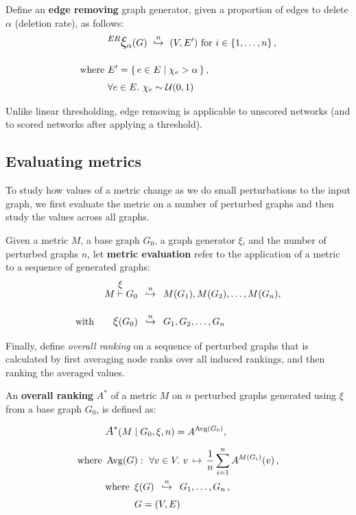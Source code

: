 \parspace

Define an \textbf{edge removing} graph generator, given a proportion of edges to delete $\alpha$ (deletion rate), as follows:
\begin{align}
    &\mathlarger{^{ER} \mathlarger{\xi}}_\alpha(G) \ \overset{n}{\hookrightarrow}\ (V, E')~\text{for}~i\in \integersto{n}, \\[10pt]
    \text{where}~&E' = \Set{ e \in E }{ \chi_e > \alpha }, \nonumber \\
    &\forall e \in E.\ \chi_e\sim\mathcal{U}(0,1) \nonumber
\end{align}


Unlike linear thresholding, edge removing is applicable to unscored networks (and to scored networks after applying a threshold).

\subsection{Evaluating metrics}\label{sec:evaluating_metrics}

To study how values of a metric change as we do small perturbations to the input graph, we first evaluate the metric on a number of perturbed graphs and then study the values across all graphs.

Given a metric $M$, a base graph $G_0$, a graph generator $\xi$, and the number of perturbed graphs $n$, let \textbf{metric evaluation} refer to the application of a metric to a sequence of generated graphs:
\begin{align}
    M \overset{\mathlarger{\xi}}{\vdash} G_0 &\generates{n} M(G_1), M(G_2), \dots, M(G_n), \\[10pt]
    \text{with}\qquad \mathlarger{\xi}(G_0) &\generates{n} G_1, G_2, \dots, G_n \nonumber
\end{align}

Finally, define \textsl{overall ranking} on a sequence of perturbed graphs that is calculated by first averaging node ranks over all induced rankings, and then ranking the averaged values.

\begin{definition}
    \label{def:overall_ranking}
    An \textbf{overall ranking} $A^*$ of a metric $M$ on $n$ perturbed graphs generated using $\xi$ from a base graph $G_0$, is defined as:

    \begin{align*}
        &\mathlarger{A^*}\!\left( M \mid G_0, \xi, n \right) = A^{\operatorname{Avg}(G_0)} ,\\[5pt]
        \text{where}~&\operatorname{Avg}(G) :\ \forall v \in V.\ v \,\mapsto\, \frac{1}{n} \sum_{i=1}^n A^{M(G_i)}(v)\, , \\
        &\begin{aligned}
             \text{where}~\,&\xi(G) \generates{n} G_1, \dots, G_n\,, \\
             & G = (V, E)
        \end{aligned}
    \end{align*}
\end{definition}

